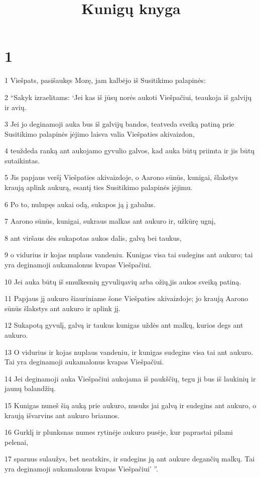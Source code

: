 

\title{Kunigų knyga}

\chapter{1}


\par 1 Viešpats, pasišaukęs Mozę, jam kalbėjo iš Susitikimo palapinės: 
\par 2 “Sakyk izraelitams: ‘Jei kas iš jūsų norės aukoti Viešpačiui, teaukoja iš galvijų ir avių. 
\par 3 Jei jo deginamoji auka bus iš galvijų bandos, teatveda sveiką patiną prie Susitikimo palapinės įėjimo laisva valia Viešpaties akivaizdon, 
\par 4 teuždeda ranką ant aukojamo gyvulio galvos, kad auka būtų priimta ir jis būtų sutaikintas. 
\par 5 Jis papjaus veršį Viešpaties akivaizdoje, o Aarono sūnūs, kunigai, šlakstys kraują aplink aukurą, esantį ties Susitikimo palapinės įėjimu. 
\par 6 Po to, nulupęs aukai odą, sukapos ją į gabalus. 
\par 7 Aarono sūnūs, kunigai, sukraus malkas ant aukuro ir, užkūrę ugnį, 
\par 8 ant viršaus dės sukapotas aukos dalis, galvą bei taukus, 
\par 9 o vidurius ir kojas nuplaus vandeniu. Kunigas visa tai sudegins ant aukuro; tai yra deginamoji auka­malonus kvapas Viešpačiui. 
\par 10 Jei auka būtų iš smulkesnių gyvulių­avių arba ožių,­jis aukos sveiką patiną. 
\par 11 Papjaus jį aukuro šiauriniame šone Viešpaties akivaizdoje; jo kraują Aarono sūnūs šlakstys ant aukuro ir aplink jį. 
\par 12 Sukapotą gyvulį, galvą ir taukus kunigas uždės ant malkų, kurios degs ant aukuro. 
\par 13 O vidurius ir kojas nuplaus vandeniu, ir kunigas sudegins visa tai ant aukuro. Tai yra deginamoji auka­malonus kvapas Viešpačiui. 
\par 14 Jei deginamoji auka Viešpačiui aukojama iš paukščių, tegu ji bus iš laukinių ir jaunų balandžių. 
\par 15 Kunigas nuneš šią auką prie aukuro, nusuks jai galvą ir sudegins ant aukuro, o kraują išvarvins ant aukuro briaunos. 
\par 16 Gurklį ir plunksnas numes rytinėje aukuro pusėje, kur paprastai pilami pelenai, 
\par 17 sparnus sulaužys, bet neatskirs, ir sudegins ją ant aukure degančių malkų. Tai yra deginamoji auka­malonus kvapas Viešpačiui’ ”.


